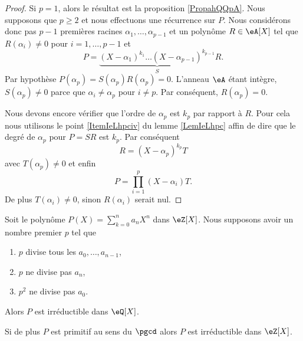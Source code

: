 \begin{proof}
    Si \( p=1\), alors le résultat est la proposition \ref{PropahQQpA}. Nous supposons que \( p\geq 2\) et nous effectuons une récurrence sur \( P\). Nous considérons donc pas \( p-1\) premières racines \( \alpha_1,\ldots, \alpha_{p-1}\) et un polynôme \( R\in\eA[X]\) tel que \( R(\alpha_i)\neq 0\) pour \( i=1,\ldots, p-1\) et
    \begin{equation}
        P=\underbrace{(X-\alpha_1)^{k_1}\ldots (X-\alpha_{p-1})^{k_{p-1}}}_SR.
    \end{equation}
    Par hypothèse \( P(\alpha_p)=S(\alpha_p)R(\alpha_p)=0\). L'anneau \( \eA\) étant intègre, \( S(\alpha_p)\neq 0\) parce que \( \alpha_i\neq \alpha_p\) pour \( i\neq p\). Par conséquent, \( R(\alpha_p)=0\).
    
    Nous devons encore vérifier que l'ordre de \( \alpha_p\) est \( k_p\) par rapport à \( R\). Pour cela nous utilisons le point \ref{ItemIeLhpciv} du lemme \ref{LemIeLhpc} affin de dire que le degré de \( \alpha_p\) pour \( P=SR\) est \( k_p\). Par conséquent
    \begin{equation}
        R=(X-\alpha_p)^{k_p}T
    \end{equation}
    avec \( T(\alpha_p)\neq 0\) et enfin
    \begin{equation}
        P=\prod_{i=1}^p(X-\alpha_i)T.
    \end{equation}
    De plus \( T(\alpha_i)\neq 0\), sinon \( R(\alpha_i)\) serait nul.
\end{proof}

\begin{proposition}
    Soit le polynôme \( P(X)=\sum_{k=0}^n a_nX^n\) dans \( \eZ[X]\). Nous supposons avoir un nombre premier \( p\) tel que
    \begin{enumerate}
        \item
            \( p\) divise tous les \( a_0,\ldots, a_{n-1}\),
        \item
            \( p\) ne divise pas \( a_n\),
        \item
            \( p^2\) ne divise pas \( a_0\).
    \end{enumerate}
    Alors \( P\) est irréductible dans \( \eQ[X]\).

    Si de plus \( P\) est primitif au sens du \( \pgcd\) alors \( P\) est irréductible dans \( \eZ[X]\).
\end{proposition}

